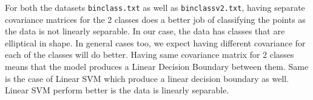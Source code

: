 \documentclass[a4paper,11pt]{article}
\begin{document}
\begin{mlsolution}
    For both the datasets \texttt{binclass.txt} as well as \texttt{binclassv2.txt}, having separate covariance matrices for the 2 classes does a better job of classifying the points as the data is not linearly separable. In our case, the data has classes that are elliptical in shape.
    In general cases too, we expect having different covariance for each of the classes will do better. Having same covariance matrix for 2 classes means that the model produces a Linear Decision Boundary between them. Same is the case of Linear SVM which produce a linear decision boundary as well. Linear SVM perform better is the data is linearly separable.


\end{mlsolution}
\end{document}
